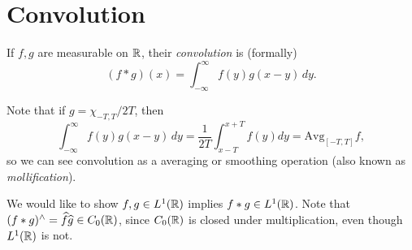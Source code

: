 \section{Convolution}

\begin{definition}
  If $f, g$ are measurable on $\mathbb{R}$, their
  \emph{convolution} is (formally)
  \[
    (f * g)(x)
    = \int_{-\infty}^\infty
    f(y) g(x - y)\, dy.
  \]
\end{definition}

\begin{remark}
  Note that if $g = \chi_{-T, T} / 2T$,
  then
  \[
    \int_{-\infty}^\infty
    f(y) g(x - y)\, dy
    = \frac{1}{2T} \int_{x - T}^{x + T} f(y) dy
    = \mathrm{Avg}_{[-T, T]} f,
  \]
  so we can see convolution as a
  averaging or smoothing operation
  (also known as \emph{mollification}).
\end{remark}

\begin{remark}
  We would like to show
  $f, g \in L^1(\mathbb{R})$ implies
  $f * g \in L^1(\mathbb{R})$. Note that
  $(f * g)^\wedge = \widehat{f} \widehat{g} \in C_0(\mathbb{R})$,
  since $C_0(\mathbb{R})$ is closed under
  multiplication, even though $L^1(\mathbb{R})$
  is not.
\end{remark}
